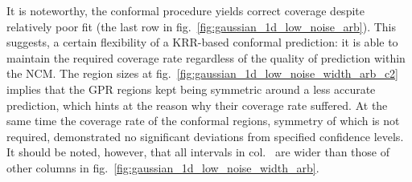 \documentclass[a4paper,14pt]{extarticle}
\begin{document}
It is noteworthy, the conformal procedure yields correct coverage despite relatively
poor fit (the last row in fig.~\ref{fig:gaussian_1d_low_noise_arb}). This suggests,
a certain flexibility of a KRR-based conformal prediction: it is able to maintain
the required coverage rate regardless of the quality of prediction within the NCM.
The region sizes at fig.~\ref{fig:gaussian_1d_low_noise_width_arb_c2} implies that
the GPR regions kept being symmetric around a less accurate prediction, which hints
at the reason why their coverage rate suffered. At the same time the coverage rate
of the conformal regions, symmetry of which is not required, demonstrated no significant
deviations from specified confidence levels. It should be noted, however, that all
intervals in col.~ are wider than
those of other columns in fig.~\ref{fig:gaussian_1d_low_noise_width_arb}.
\end{document}
